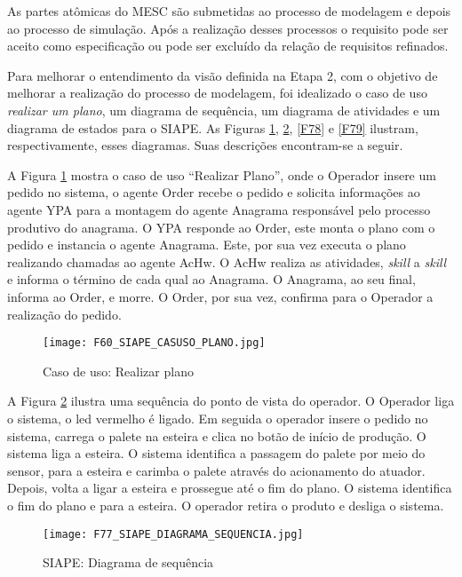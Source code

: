As partes atômicas do MESC são submetidas ao processo de modelagem e depois ao processo de simulação. Após a realização desses processos o requisito pode ser aceito como especificação ou pode ser excluído da relação de  requisitos refinados. \par 
 	
Para melhorar o entendimento da visão definida na Etapa 2, com o objetivo de melhorar a realização do processo de modelagem, foi idealizado o caso de uso \textit{realizar um plano}, um diagrama de sequência, um diagrama de atividades e um diagrama de estados para o SIAPE. As Figuras \ref{F60}, \ref{F77}, \ref{F78}  e \ref{F79} ilustram, respectivamente, esses diagramas. Suas descrições encontram-se a seguir.
 	
A Figura \ref{F60} mostra o caso de uso ``Realizar Plano'', onde o Operador insere um pedido no sistema, o agente Order recebe o pedido e solicita informações ao agente YPA para a montagem do agente Anagrama responsável pelo processo produtivo do anagrama. O YPA responde ao Order, este monta o plano com o pedido e instancia o agente Anagrama. Este, por sua vez executa o plano realizando chamadas ao agente AcHw. O AcHw realiza as atividades, \textit{skill} a \textit{skill} e informa o término de cada qual ao Anagrama. O Anagrama, ao seu final, informa ao Order, e morre. O Order, por sua vez, confirma para o Operador a realização do pedido.

\begin{figure}[!h]
	 	\centering
	 	\texttt{[image: F60\_SIAPE\_CASUSO\_PLANO.jpg]} 
	 	\caption{Caso de uso: Realizar plano}
	 	\label{F60}
\end{figure}
 		 
A Figura \ref{F77} ilustra uma sequência do ponto de vista do operador. O Operador liga o sistema, o led vermelho é ligado. Em seguida o operador insere o pedido no sistema, carrega o palete na esteira e clica no botão de início de produção. O sistema liga a esteira. O sistema identifica a passagem do palete por meio do sensor, para a esteira e carimba o palete através do acionamento do atuador. Depois, volta a ligar a esteira e prossegue até o fim do plano. O sistema identifica o fim do plano e para a esteira. O operador retira o produto e desliga o sistema. 

\begin{figure}[!h]
 	 	\centering
 	 	\texttt{[image: F77\_SIAPE\_DIAGRAMA\_SEQUENCIA.jpg]} 
 	 	\caption{SIAPE: Diagrama de sequência}
 	 	\label{F77}
\end{figure}
 		 	 
